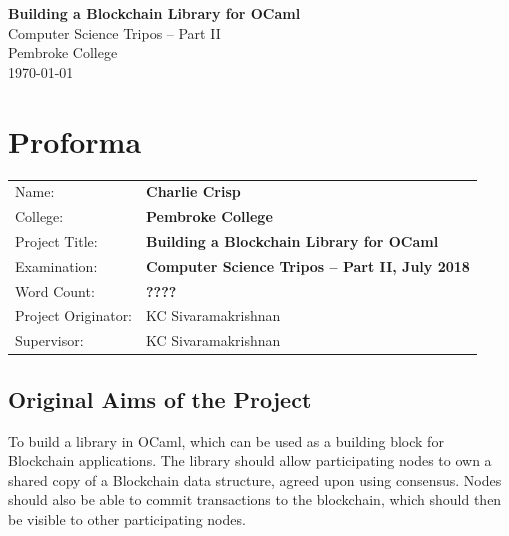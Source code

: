 \documentclass[12pt,a4paper,twoside,openright]{report}
\begin{document}
	
	
	
	
	\pagestyle{empty}
	
	
	\vspace*{60mm}
	\begin{center}
	\Huge
	\textbf{Building a Blockchain Library for OCaml} \\[5mm]
	Computer Science Tripos -- Part II \\[5mm]
	Pembroke College \\[5mm]
	\today  %
	\end{center}
	
	
	\pagestyle{plain}
	
	\chapter*{Proforma}
	
	{\large
	\begin{tabular}{ll}
	Name:               & \bf Charlie Crisp                       \\
	College:            & \bf Pembroke College                     \\
	Project Title:      & \bf Building a Blockchain Library for OCaml \\
	Examination:        & \bf Computer Science Tripos -- Part II, July 2018  \\
	Word Count:         & \bf ????\footnotemark[1]\\
	Project Originator: & KC Sivaramakrishnan                    \\
	Supervisor:         & KC Sivaramakrishnan                    
	\end{tabular}
	}
	
	
	\section*{Original Aims of the Project}
	
	To build a library in OCaml, which can be used as a building block for Blockchain applications. 
	The library should allow participating nodes to own a shared copy of a Blockchain data structure, agreed upon using consensus.
	Nodes should also be able to commit transactions to the blockchain, which should then be visible to other participating nodes. 
	
\end{document}
